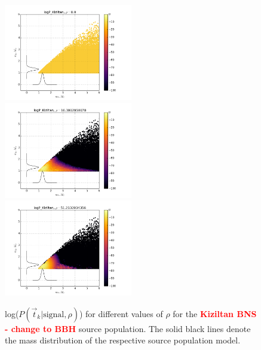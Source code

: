 \documentclass[twocolumn,showpacs,unsortedaddress,superscriptaddress,showkeys,nofootinbib,preprintnumbers,letterpaper]{revtex4-1}
\newcommand{\FIXME}[1]{\textcolor{red}{\textbf{#1}}}
\begin{document}
\begin{figure}
\includegraphics[width=0.5\textwidth]{logP_Kiziltanrho0_0.png}
\includegraphics[width=0.5\textwidth]{logP_Kiziltanrho16_3802850078.png}
\includegraphics[width=0.5\textwidth]{logP_Kiziltanrho51_2132034356.png}
\caption{log($P(\vec{t}_k|\text{signal},\rho)$) for different values of $\rho$ for the \FIXME{Kiziltan BNS - change to BBH} source population. The solid black lines denote the mass distribution of the respective source population model.}
\label{fig:P_tkj_BBH}
\end{figure}
\end{document}
